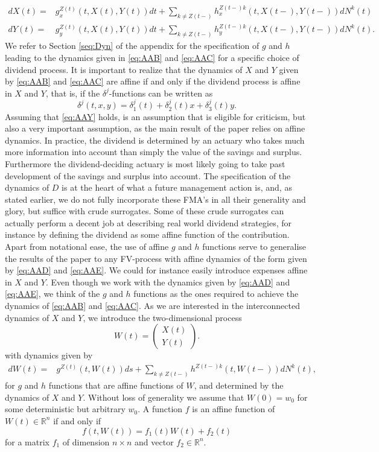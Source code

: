 \documentclass[12pt]{article}
\newcommand{\R}{\mathbb{R}}
\theoremstyle{my_thm}
\begin{document}
\begin{align}
dX(t)=&g^{Z(t)}_{x}(t,X(t),Y(t))dt + \sum_{k \neq Z(t-)}  h^{Z(t-)k}_{x}(t,X(t-),Y(t-)) dN^k(t)
\label{eq:AAD}
\\
dY(t)=&g^{Z(t)}_{y}(t,X(t),Y(t))dt + \sum_{k \neq Z(t-)} h^{Z(t-)k}_{y}(t,X(t-), Y(t-)) dN^k(t)
\label{eq:AAE}.
\end{align}
We refer to Section \ref{seq:Dyn} of the appendix for the specification of $g$ and $h$ leading to the dynamics given in \eqref{eq:AAB} and \eqref{eq:AAC} for a specific choice of dividend process. It is important to realize that the dynamics of $X$ and $Y$ given by \eqref{eq:AAB} and \eqref{eq:AAC} are affine if and only if the dividend process is affine in $X$ and $Y$, that is, if the $\delta^j$-functions can be written as
\begin{equation}
\delta^j(t,x,y)=\delta_1^j(t)+\delta_2^j(t)x+\delta_3^j(t)y. \label{eq:AAY}
\end{equation}
Assuming that \eqref{eq:AAY} holds, is an assumption that is eligible for criticism, but also a very important assumption, as the main result of the paper relies on affine dynamics. In practice, the dividend is determined by an actuary who takes much more information into account than simply the value of the savings and surplus. Furthermore the dividend-deciding actuary is most likely going to take past development of the savings and surplus into account. The specification of the dynamics of $D$ is at the heart of what a future management action is, and, as stated earlier, we do not fully incorporate these FMA's in all their generality and glory, but suffice with crude surrogates. Some of these crude surrogates can actually perform a decent job at describing real world dividend strategies, for instance by defining the dividend as some affine function of the contribution.
\\[12pt]
Apart from notational ease, the use of affine $g$ and $h$ functions serve to generalise the results of the paper to any FV-process with affine dynamics of the form given by \eqref{eq:AAD} and \eqref{eq:AAE}. We could for instance easily introduce expenses affine in $X$ and $Y$. Even though we work with the dynamics given by \eqref{eq:AAD} and \eqref{eq:AAE}, we think of the $g$ and $h$ functions as the ones required to achieve the dynamics of \eqref{eq:AAB} and \eqref{eq:AAC}. As we are interested in the interconnected dynamics of $X$ and $Y$, we introduce the two-dimensional process 
$$
W(t)= \begin{pmatrix}
X(t)\\
Y(t)
\end{pmatrix}.
$$
with dynamics given by
\begin{align*}
dW(t)=& g^{Z(t)}(t,W(t)) ds+ \sum_{k\neq Z(t-)} h^{Z(t-)k}(t,W(t-)) dN^k(t),
\end{align*}
for $g$ and $h$ functions that are affine functions of $W$, and determined by the dynamics of $X$ and $Y$. Without loss of generality we assume that $W(0)=w_0$ for some deterministic but arbitrary $w_0$. A function $f$ is an affine function of $W(t)\in \R^n$ if and only if
$$
f(t,W(t))=f_1(t) W(t) + f_2(t)
$$
for a matrix $f_1$ of dimension $n \times n$ and vector $f_2 \in \R^n$.
\end{document}
